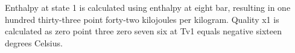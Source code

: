 Enthalpy at state 1 is calculated using enthalpy at eight bar, resulting in one hundred thirty-three point forty-two kilojoules per kilogram. Quality x1 is calculated as zero point three zero seven six at Tv1 equals negative sixteen degrees Celsius.
